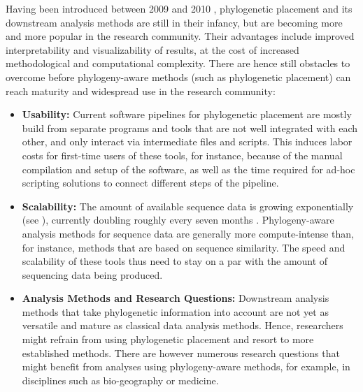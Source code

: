 Having been introduced between 2009 and 2010 \cite{Berger2009,Matsen2010a},
phylogenetic placement and its downstream analysis methods are still in their infancy,
but are becoming more and more popular in the research community.
Their advantages include improved interpretability and visualizability of results,
at the cost of increased methodological and computational complexity.
There are hence still obstacles to overcome before phylogeny-aware methods (such as phylogenetic placement)
can reach maturity and widespread use in the research community:

\begin{itemize}
    \item \textbf{Usability:}
          Current software pipelines for phylogenetic placement are mostly build from separate programs and tools
          that are not well integrated with each other, and only interact via intermediate files and scripts.
          This induces labor costs for first-time users of these tools,
          for instance, because of the manual compilation and setup of the software,
          as well as the time required for ad-hoc scripting solutions to connect different steps of the pipeline.
    \item \textbf{Scalability:}
          The amount of available sequence data is growing exponentially (see ),
          currently doubling roughly every seven months \cite{Stephens2015}.
          Phylogeny-aware analysis methods for sequence data are generally more compute-intense than, for instance,
          methods that are based on sequence similarity.
          The speed and scalability of these tools thus
          need to stay on a par with the amount of sequencing data being produced.
    \item \textbf{Analysis Methods and Research Questions:}
          Downstream analysis methods that take phylogenetic information into account
          are not yet as versatile and mature as classical data analysis methods.
          Hence, researchers might refrain from using phylogenetic placement and resort to more established methods.
          There are however numerous research questions that might benefit from analyses using phylogeny-aware methods,
          for example, in disciplines such as bio-geography or medicine.
\end{itemize}

